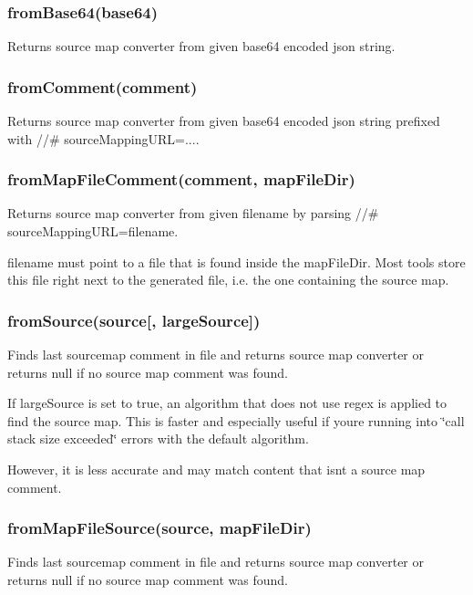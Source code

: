 \subsubsection*{from\+Base64(base64)}

Returns source map converter from given base64 encoded json string.

\subsubsection*{from\+Comment(comment)}

Returns source map converter from given base64 encoded json string prefixed with {\ttfamily //\# source\+Mapping\+U\+RL=...}.

\subsubsection*{from\+Map\+File\+Comment(comment, map\+File\+Dir)}

Returns source map converter from given {\ttfamily filename} by parsing {\ttfamily //\# source\+Mapping\+U\+RL=filename}.

{\ttfamily filename} must point to a file that is found inside the {\ttfamily map\+File\+Dir}. Most tools store this file right next to the generated file, i.\+e. the one containing the source map.

\subsubsection*{from\+Source(source\mbox{[}, large\+Source\mbox{]})}

Finds last sourcemap comment in file and returns source map converter or returns null if no source map comment was found.

If {\ttfamily large\+Source} is set to {\ttfamily true}, an algorithm that does not use regex is applied to find the source map. This is faster and especially useful if you\textquotesingle{}re running into \char`\"{}call stack size exceeded\char`\"{} errors with the default algorithm.

However, it is less accurate and may match content that isn\textquotesingle{}t a source map comment.

\subsubsection*{from\+Map\+File\+Source(source, map\+File\+Dir)}

Finds last sourcemap comment in file and returns source map converter or returns null if no source map comment was found.

